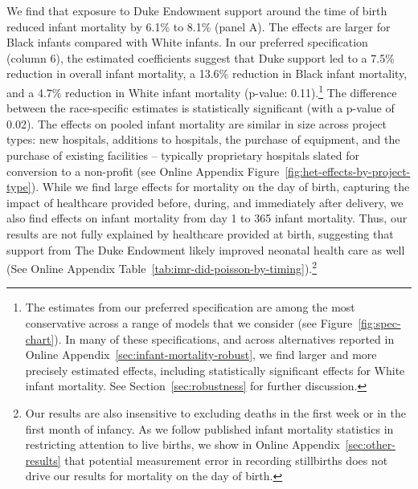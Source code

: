 \documentclass[12pt]{article}
\begin{document}
We find that exposure to Duke Endowment support around the time of birth reduced infant mortality by 6.1\% to 8.1\% (panel A). The effects are larger for Black infants compared with White infants.
In our preferred specification (column 6), the estimated coefficients suggest that Duke support led to a 7.5\% reduction in overall infant mortality, a 13.6\% reduction in Black infant mortality, and a 4.7\% reduction in White infant mortality (p-value: 0.11).\footnote{The estimates from our preferred specification are among the most conservative across a range of models that we consider (see Figure~\ref{fig:spec-chart}). In many of these specifications, and across alternatives reported in Online Appendix~\ref{sec:infant-mortality-robust}, we find larger and more precisely estimated effects, including statistically significant effects for White infant mortality. See Section~\ref{sec:robustness} for further discussion.} 
The difference between the race-specific estimates is statistically significant (with a p-value of 0.02). 
The effects on pooled infant mortality are similar in size across project types: new hospitals, additions to hospitals, the purchase of equipment, and the purchase of existing facilities -- typically proprietary hospitals slated for conversion to a non-profit (see Online Appendix Figure~\ref{fig:het-effects-by-project-type}). 
While we find large effects for mortality on the day of birth, capturing the impact of healthcare provided before, during, and immediately after delivery, we also find effects on infant mortality from day 1 to 365 infant mortality. 
Thus, our results are not fully explained by healthcare provided at birth, suggesting that support from The Duke Endowment likely improved neonatal health care as well (See Online Appendix Table~\ref{tab:imr-did-poisson-by-timing}).\footnote{Our results are also insensitive to excluding deaths in the first week or in the first month of infancy. As we follow published infant mortality statistics in restricting attention to live births, we show in Online Appendix~\ref{sec:other-results} that potential measurement error in recording stillbirths does not drive our results for mortality on the day of birth.} 
\end{document}
